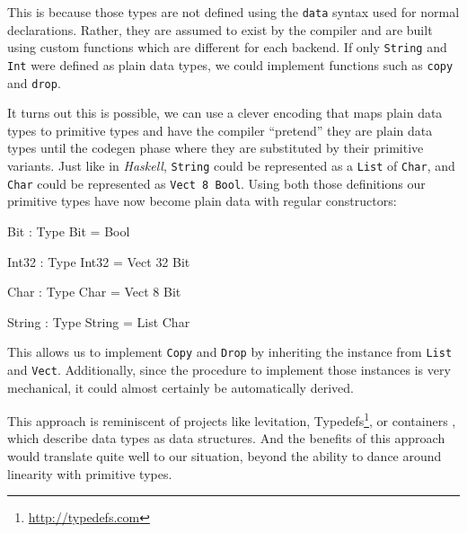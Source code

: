 \documentclass[
]{article}
\newenvironment{Shaded}{}{}
\newcommand{\DataTypeTok}[1]{\textcolor[rgb]{0.56,0.13,0.00}{#1}}
\newcommand{\DecValTok}[1]{\textcolor[rgb]{0.25,0.63,0.44}{#1}}
\newcommand{\OperatorTok}[1]{\textcolor[rgb]{0.40,0.40,0.40}{#1}}
\newcommand{\OtherTok}[1]{\textcolor[rgb]{0.00,0.44,0.13}{#1}}
\begin{document}
This is because those types are not defined using the \texttt{data}
syntax used for normal declarations. Rather, they are assumed to exist
by the compiler and are built using custom functions which are different
for each backend. If only \texttt{String} and \texttt{Int} were defined
as plain data types, we could implement functions such as \texttt{copy}
and \texttt{drop}.

It turns out this is possible, we can use a clever encoding that maps
plain data types to primitive types and have the compiler ``pretend''
they are plain data types until the codegen phase where they are
substituted by their primitive variants. Just like in \emph{Haskell},
\texttt{String} could be represented as a \texttt{List} of
\texttt{Char}, and \texttt{Char} could be represented as
\texttt{Vect\ 8\ Bool}. Using both those definitions our primitive types
have now become plain data with regular constructors:

\begin{Shaded}
\begin{Highlighting}[]
\DataTypeTok{Bit} \OperatorTok{:} \DataTypeTok{Type}
\DataTypeTok{Bit} \OtherTok{=} \DataTypeTok{Bool}

\DataTypeTok{Int32} \OperatorTok{:} \DataTypeTok{Type}
\DataTypeTok{Int32} \OtherTok{=} \DataTypeTok{Vect} \DecValTok{32} \DataTypeTok{Bit}

\DataTypeTok{Char} \OperatorTok{:} \DataTypeTok{Type}
\DataTypeTok{Char} \OtherTok{=} \DataTypeTok{Vect} \DecValTok{8} \DataTypeTok{Bit}

\DataTypeTok{String} \OperatorTok{:} \DataTypeTok{Type}
\DataTypeTok{String} \OtherTok{=} \DataTypeTok{List} \DataTypeTok{Char}
\end{Highlighting}
\end{Shaded}

This allows us to implement \texttt{Copy} and \texttt{Drop} by
inheriting the instance from \texttt{List} and \texttt{Vect}.
Additionally, since the procedure to implement those instances is very
mechanical, it could almost certainly be automatically derived.

This approach is reminiscent of projects like
levitation\cite{levitation}, Typedefs\footnote{\url{http://typedefs.com}},
or containers\cite{indexed_containers} , which describe data types as
data structures. And the benefits of this approach would translate quite
well to our situation, beyond the ability to dance around linearity with
primitive types.
\end{document}

